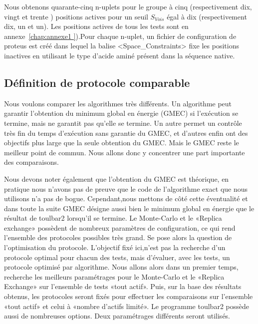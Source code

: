 Nous obtenons quarante-cinq n-uplets pour le groupe à cinq (respectivement dix, vingt et trente ) positions actives pour un seuil $S_{Vois}$ égal à dix (respectivement dix, un et un). Les positions actives de tous les tests sont en annexe~\ref{chap:annexe1 }).Pour chaque n-uplet, un fichier de configuration de proteus est créé dans lequel la balise <Space\_Constraints> fixe les positions inactives en utilisant le type d'acide aminé présent dans la séquence native. 


\subsection{Définition de protocole comparable}
\label{sec:proto_compa}
Nous voulons comparer les algorithmes très différents. Un algorithme peut garantir l'obtention du minimum global en énergie (GMEC) si l'exécution se termine, mais ne garantit pas qu'elle se termine. Un autre permet un contrôle très fin du temps d'exécution sans garantie du GMEC, et d'autres enfin ont des objectifs plus large que la seule obtention du GMEC.
Mais le GMEC reste le meilleur point de commun. Nous allons donc y concentrer une part importante des comparaisons.

Nous devons noter également que l'obtention du GMEC est théorique, en pratique nous n'avons pas de preuve que le code de l'algorithme exact que nous utilisons n'a pas de bogue. Cependant,nous mettons de côté cette éventualité et dans toute la suite GMEC désigne aussi bien le minimum global en énergie que le résultat de toulbar2 lorsqu'il se termine.  
Le Monte-Carlo et le «Replica exchange» possèdent de nombreux paramètres de configuration, ce qui rend l'ensemble des protocoles possibles très grand. Se pose alors la question de l'optimisation du protocole. L'objectif fixé ici,n'est pas la recherche d'un protocole optimal pour chacun des tests, mais d'évaluer, avec les tests, un protocole optimisé par algorithme.
Nous allons alors dans un premier temps, recherche les meilleurs paramétrages pour le Monte-Carlo et le «Replica Exchange» sur l'ensemble de tests «tout actif».
Puis, sur la base des résultats obtenus, les protocoles seront fixés pour effectuer les comparaisons sur l'ensemble  «tout actif» et celui à «nombre d'actifs limité».
Le programme toulbar2 possède aussi de nombreuses options. Deux paramétrages différents seront utilisés.

